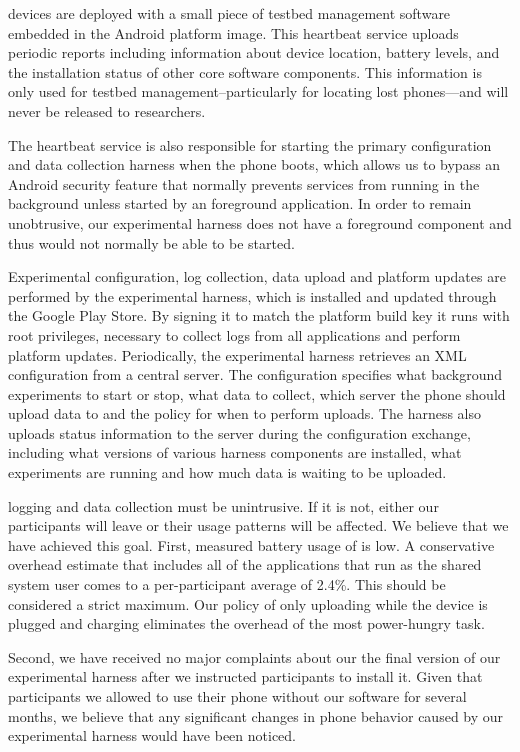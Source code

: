 \PhoneLab{} devices are deployed with a small piece of testbed management
software embedded in the Android platform image. This heartbeat service
uploads periodic reports including information about device location, battery
levels, and the installation status of other core \PhoneLab{} software
components. This information is only used for testbed
management--particularly for locating lost phones---and will never be
released to researchers.

The heartbeat service is also responsible for starting the primary
\PhoneLab{} configuration and data collection harness when the phone boots,
which allows us to bypass an Android security feature that normally prevents
services from running in the background unless started by an foreground
application. In order to remain unobtrusive, our experimental harness does
not have a foreground component and thus would not normally be able to be
started.

Experimental configuration, log collection, data upload and platform updates
are performed by the \PhoneLab{} experimental harness, which is installed and
updated through the Google Play Store. By signing it to match the platform
build key it runs with root privileges, necessary to collect logs from all
applications and perform platform updates. Periodically, the experimental
harness retrieves an XML configuration from a central \PhoneLab{} server. The
configuration specifies what background experiments to start or stop, what
data to collect, which server the phone should upload data to and the policy
for when to perform uploads. The \PhoneLab{} harness also uploads status
information to the server during the configuration exchange, including what
versions of various harness components are installed, what experiments are
running and how much data is waiting to be uploaded.


\PhoneLab{} logging and data collection must be unintrusive. If it is not,
either our participants will leave or their usage patterns will be affected.
We believe that we have achieved this goal. First, measured battery usage of
\PhoneLab{} is low. A conservative overhead estimate that includes all of the
applications that run as the shared system user comes to a per-participant
average of 2.4\%. This should be considered a strict maximum. Our policy of
only uploading while the device is plugged and charging eliminates the
overhead of the most power-hungry task.

Second, we have received no major complaints about our the final version of
our \PhoneLab{} experimental harness after we instructed participants to
install it. Given that participants we allowed to use their phone without our
software for several months, we believe that any significant changes in phone
behavior caused by our experimental harness would have been noticed.

